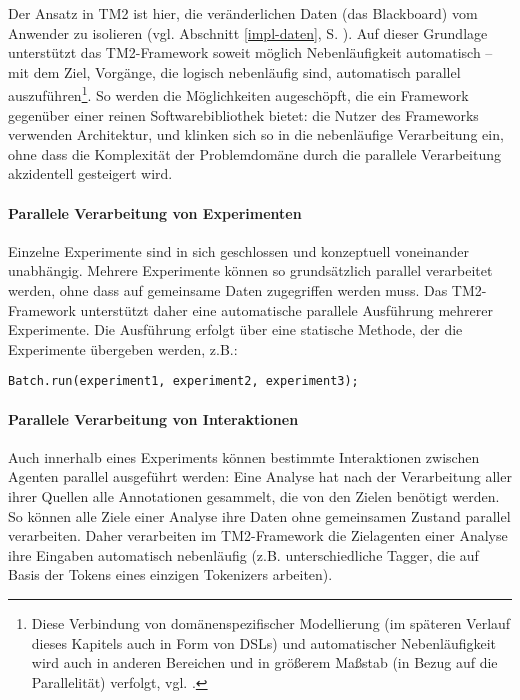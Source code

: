 \documentclass[abstracton, 12pt]{scrartcl}
\begin{document}
Der Ansatz in TM2 ist hier, die veränderlichen Daten (das Blackboard) vom Anwender zu isolieren (vgl. Abschnitt \ref{impl-daten}, S. \pageref{impl-daten}). Auf dieser Grundlage unterstützt das TM2-Framework soweit möglich Nebenläufigkeit automatisch -- mit dem Ziel, Vorgänge, die logisch nebenläufig sind, automatisch parallel auszuführen\footnote{Diese Verbindung von domänenspezifischer Modellierung (im späteren Verlauf dieses Kapitels auch in Form von DSLs) und automatischer Nebenläufigkeit wird auch in anderen Bereichen und in größerem Maßstab (in Bezug auf die Parallelität) verfolgt, vgl. \citet{ChafiEtAl2010}.}. So werden die Möglichkeiten augeschöpft, die ein Framework gegenüber einer reinen Softwarebibliothek bietet: die Nutzer des Frameworks verwenden Architektur, und klinken sich so in die nebenläufige Verarbeitung ein, ohne dass die Komplexität der Problemdomäne durch die parallele Verarbeitung akzidentell gesteigert wird.

\paragraph{Parallele Verarbeitung von Experimenten}

Einzelne Experimente sind in sich geschlossen und konzeptuell voneinander unabhängig. Mehrere Experimente können so grundsätzlich parallel verarbeitet werden, ohne dass auf gemeinsame Daten zugegriffen werden muss. Das TM2-Framework unterstützt daher eine automatische parallele Ausführung mehrerer Experimente. Die Ausführung erfolgt über eine statische Methode, der die Experimente übergeben werden, z.B.:

\begin{lstlisting}
Batch.run(experiment1, experiment2, experiment3);
\end{lstlisting}

\paragraph{Parallele Verarbeitung von Interaktionen}

Auch innerhalb eines Experiments können bestimmte Interaktionen zwischen Agenten parallel ausgeführt werden: Eine Analyse hat nach der Verarbeitung aller ihrer Quellen alle Annotationen gesammelt, die von den Zielen benötigt werden. So können alle Ziele einer Analyse ihre Daten ohne gemeinsamen Zustand parallel verarbeiten. Daher verarbeiten im TM2-Framework die Zielagenten einer Analyse ihre Eingaben automatisch nebenläufig (z.B. unterschiedliche Tagger, die auf Basis der Tokens eines einzigen Tokenizers arbeiten). 
\end{document}
